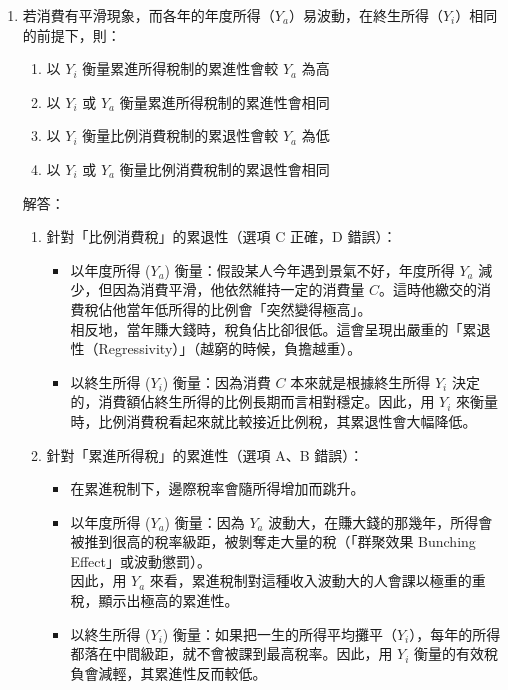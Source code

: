 \documentclass[12pt, a4paper]{article}
\begin{document}
\begin{enumerate}
    \item 若消費有平滑現象，而各年的年度所得（\(Y_a\)）易波動，在終生所得（\(Y_i\)）相同的前提下，則：
    \begin{enumerate}[label=\Alph*.]
        \item 以 \(Y_i\) 衡量累進所得稅制的累進性會較 \(Y_a\) 為高
        \item 以 \(Y_i\) 或 \(Y_a\) 衡量累進所得稅制的累進性會相同
        \item 以 \(Y_i\) 衡量比例消費稅制的累退性會較 \(Y_a\) 為低
        \item 以 \(Y_i\) 或 \(Y_a\) 衡量比例消費稅制的累退性會相同
    \end{enumerate}
    解答：
    \begin{enumerate}[1.]
        \item  針對「比例消費稅」的累退性（選項 C 正確，D 錯誤）：
        \begin{itemize}
            \item 以年度所得 (\(Y_a\)) 衡量：假設某人今年遇到景氣不好，年度所得 \(Y_a\) 減少，但因為消費平滑，他依然維持一定的消費量 \(C\)。這時他繳交的消費稅佔他當年低所得的比例會「突然變得極高」。\\
            相反地，當年賺大錢時，稅負佔比卻很低。這會呈現出嚴重的「累退性（Regressivity）」（越窮的時候，負擔越重）。
            \item 以終生所得 (\(Y_i\)) 衡量：因為消費 \(C\) 本來就是根據終生所得 \(Y_i\) 決定的，消費額佔終生所得的比例長期而言相對穩定。因此，用 \(Y_i\) 來衡量時，比例消費稅看起來就比較接近比例稅，其累退性會大幅降低。
        \end{itemize}
        \item 針對「累進所得稅」的累進性（選項 A、B 錯誤）：
        \begin{itemize}
            \item 在累進稅制下，邊際稅率會隨所得增加而跳升。
            \item 以年度所得 (\(Y_a\)) 衡量：因為 \(Y_a\) 波動大，在賺大錢的那幾年，所得會被推到很高的稅率級距，被剝奪走大量的稅（「群聚效果 Bunching Effect」或波動懲罰）。\\
            因此，用 \(Y_a\) 來看，累進稅制對這種收入波動大的人會課以極重的重稅，顯示出極高的累進性。
            \item 以終生所得 (\(Y_i\)) 衡量：如果把一生的所得平均攤平（\(Y_i\)），每年的所得都落在中間級距，就不會被課到最高稅率。因此，用 \(Y_i\) 衡量的有效稅負會減輕，其累進性反而較低。
        \end{itemize}
    \end{enumerate}


\end{enumerate}
\end{document}
